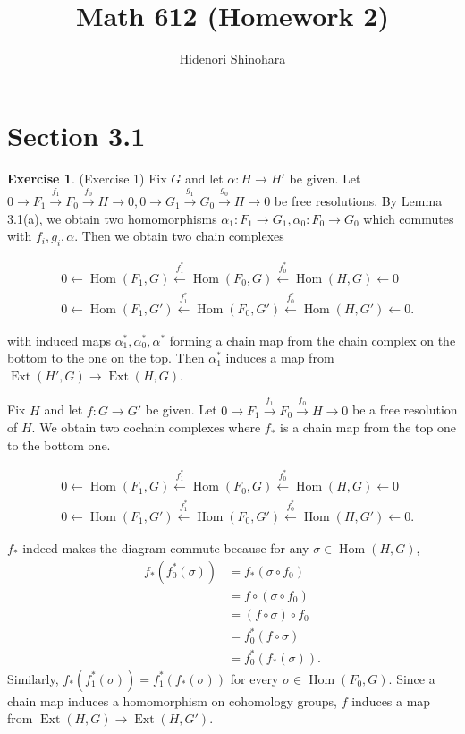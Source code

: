\documentclass[12pt, psamsfonts]{amsart}
\theoremstyle{definition}
\newtheorem*{exer}{Exercise}
\theoremstyle{remark}
\DeclareMathOperator{\Ext}{Ext}
\DeclareMathOperator{\Hom}{Hom}
\numberwithin{equation}{section}
\begin{document}
\title{Math 612 (Homework 2)}
\author{Hidenori Shinohara}
\maketitle

\section{Section 3.1}

\begin{exer}{(Exercise 1)}
  Fix $G$ and let $\alpha: H \rightarrow H'$ be given.
  Let $0 \rightarrow F_1 \xrightarrow{f_1} F_0 \xrightarrow{f_0} H \rightarrow 0, 0 \rightarrow G_1 \xrightarrow{g_1} G_0 \xrightarrow{g_0} H \rightarrow 0$ be free resolutions.
  By Lemma 3.1(a), we obtain two homomorphisms $\alpha_1: F_1 \rightarrow G_1, \alpha_0: F_0 \rightarrow G_0$ which commutes with $f_i, g_i, \alpha$.
  Then we obtain two chain complexes

  \begin{align*}
    &0 \leftarrow \Hom(F_1, G) \xleftarrow{f_1^{\ast}} \Hom(F_0, G) \xleftarrow{f_0^{\ast}} \Hom(H, G) \leftarrow 0 \\
    &0 \leftarrow \Hom(F_1, G') \xleftarrow{f_1^{\ast}} \Hom(F_0, G') \xleftarrow{f_0^{\ast}} \Hom(H, G') \leftarrow 0.
  \end{align*}

  with induced maps $\alpha_1^{\ast}, \alpha_0^{\ast}, \alpha^{\ast}$ forming a chain map from the chain complex on the bottom to the one on the top.
  Then $\alpha_1^{\ast}$ induces a map from $\Ext(H', G) \rightarrow \Ext(H, G)$.

  Fix $H$ and let $f: G \rightarrow G'$ be given.
  Let $0 \rightarrow F_1 \xrightarrow{f_1} F_0 \xrightarrow{f_0} H \rightarrow 0$ be a free resolution of $H$.
  We obtain two cochain complexes where $f_{\ast}$ is a chain map from the top one to the bottom one.

  \begin{align*}
    &0 \leftarrow \Hom(F_1, G) \xleftarrow{f_1^{\ast}} \Hom(F_0, G) \xleftarrow{f_0^{\ast}} \Hom(H, G) \leftarrow 0 \\
    &0 \leftarrow \Hom(F_1, G') \xleftarrow{f_1^{\ast}} \Hom(F_0, G') \xleftarrow{f_0^{\ast}} \Hom(H, G') \leftarrow 0.
  \end{align*}

  $f_{\ast}$ indeed makes the diagram commute because for any $\sigma \in \Hom(H, G)$,
  \begin{align*} 
    f_{\ast}(f_0^{\ast}(\sigma))
      &= f_{\ast}(\sigma \circ f_0) \\
      &= f \circ (\sigma \circ f_0) \\
      &= (f \circ \sigma) \circ f_0 \\
      &= f_0^{\ast}(f \circ \sigma) \\
      &= f_0^{\ast}(f_{\ast}(\sigma)).
  \end{align*}
  Similarly, $f_{\ast}(f_1^{\ast}(\sigma)) = f_1^{\ast}(f_{\ast}(\sigma))$ for every $\sigma \in \Hom(F_0, G)$.
  Since a chain map induces a homomorphism on cohomology groups, $f$ induces a map from $\Ext(H, G) \rightarrow \Ext(H, G')$.
\end{exer}
\end{document}

